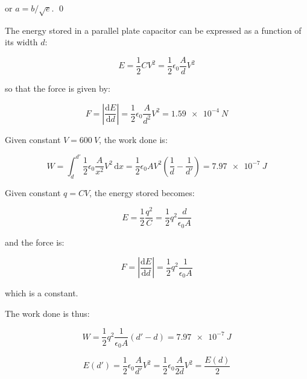 \documentclass[12pt]{article}
\begin{document}
or $a = b/\sqrt{e}$.
\qed



The energy stored in a parallel plate capacitor can be expressed as a function of its width $d$:

\begin{equation}
    E = \frac{1}{2} C V^{2} = \frac{1}{2} \epsilon_{0} \frac{A}{d} V^{2}
\end{equation}

so that the force is given by:

\begin{equation}
    F = \left\lvert \frac{\mathrm{d}E}{\mathrm{d}d} \right\rvert = \frac{1}{2} \epsilon_{0} \frac{A}{d^{2}} V^{2} = \qty{1.59e-4}{N}
\end{equation}

Given constant $V = \qty{600}{V}$, the work done is:

\begin{equation}
    W = \int_{d}^{d'} \frac{1}{2} \epsilon_{0} \frac{A}{x^{2}} V^{2} \, \mathrm{d}x = \frac{1}{2} \epsilon_{0} A V^{2} \left( \frac{1}{d} - \frac{1}{d'} \right) = \qty{7.97e-7}{J}
\end{equation}

Given constant $q = CV$, the energy stored becomes:

\begin{equation}
    E = \frac{1}{2} \frac{q^{2}}{C} = \frac{1}{2} q^{2} \frac{d}{\epsilon_{0} A}
\end{equation}

and the force is:

\begin{equation}
    F = \left\lvert \frac{\mathrm{d}E}{\mathrm{d}d} \right\rvert = \frac{1}{2} q^{2} \frac{1}{\epsilon_{0} A}
\end{equation}

which is a constant.

The work done is thus:

\begin{equation}
    W = \frac{1}{2} q^{2} \frac{1}{\epsilon_{0} A} (d' - d) = \qty{7.97e-7}{J}
\end{equation}


\begin{equation}
    E(d') = \frac{1}{2} \epsilon_{0} \frac{A}{d'} V^{2} = \frac{1}{2} \epsilon_{0} \frac{A}{2d} V^{2} = \frac{E(d)}{2}
\end{equation}
\end{document}
